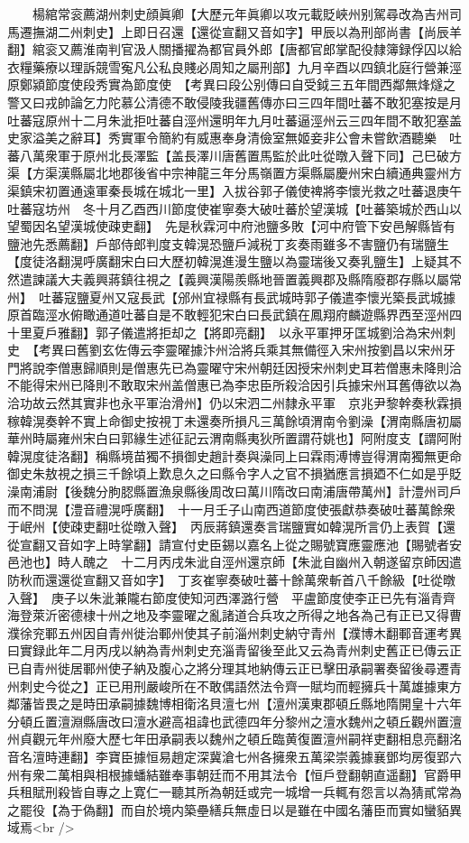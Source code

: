　　楊綰常衮薦湖州刺史顔眞卿【大歷元年眞卿以攻元載貶峽州别駕尋改為吉州司馬遷撫湖二州刺史】上即日召還【還從宣翻又音如字】甲辰以為刑部尚書【尚辰羊翻】綰衮又薦淮南判官汲人關播擢為都官員外郎【唐都官郎掌配役隸簿録俘囚以給衣糧藥療以理訴競雪寃凡公私良賤必周知之屬刑部】九月辛酉以四鎮北庭行營兼涇原鄭潁節度使段秀實為節度使　【考異曰段公别傳曰自受鉞三五年間西鄰無烽燧之警又曰戎帥論乞力陀慕公清德不敢侵陵我疆舊傳亦曰三四年間吐蕃不敢犯塞按是月吐蕃寇原州十二月朱泚拒吐蕃自涇州還明年九月吐蕃逼涇州云三四年間不敢犯塞盖史家溢美之辭耳】秀實軍令簡約有威惠奉身清儉室無姬妾非公會未嘗飲酒聽樂　吐蕃八萬衆軍于原州北長澤監【盖長澤川唐舊置馬監於此吐從暾入聲下同】己巳破方渠【方渠漢縣屬北地郡後省中宗神龍三年分馬嶺置方渠縣屬慶州宋白續通典靈州方渠鎮宋初置通遠軍秦長城在城北一里】入拔谷郭子儀使禆將李懷光救之吐蕃退庚午吐蕃寇坊州　冬十月乙酉西川節度使崔寧奏大破吐蕃於望漢城【吐蕃築城於西山以望蜀因名望漢城使疎吏翻】　先是秋霖河中府池鹽多敗【河中府管下安邑解縣皆有鹽池先悉薦翻】戶部侍郎判度支韓滉恐鹽戶減税丁亥奏雨雖多不害鹽仍有瑞鹽生【度徒洛翻滉呼廣翻宋白曰大歷初韓滉進漫生鹽以為靈瑞後又奏乳鹽生】上疑其不然遣諫議大夫義興蔣鎮往視之【義興漢陽羨縣地晉置義興郡及縣隋廢郡存縣以屬常州】　吐蕃寇鹽夏州又寇長武【邠州宜禄縣有長武城時郭子儀遣李懷光築長武城據原首臨涇水俯瞰通道吐蕃自是不敢輕犯宋白曰長武鎮在鳳翔府麟遊縣界西至涇州四十里夏戶雅翻】郭子儀遣將拒却之【將即亮翻】　以永平軍押牙匡城劉洽為宋州刺史　【考異曰舊劉玄佐傳云李靈曜據汴州洽將兵乘其無備徑入宋州按劉昌以宋州牙門將說李僧惠歸順則是僧惠先已為靈曜守宋州朝廷因授宋州刺史耳若僧惠未降則洽不能得宋州已降則不敢取宋州盖僧惠已為李忠臣所殺洽因引兵據宋州耳舊傳欲以為洽功故云然其實非也永平軍治滑州】仍以宋泗二州隸永平軍　京兆尹黎幹奏秋霖損稼韓滉奏幹不實上命御史按視丁未還奏所損凡三萬餘頃渭南令劉澡【渭南縣唐初屬華州時屬雍州宋白曰郭緣生述征記云渭南縣夷狄所置謂苻姚也】阿附度支【謂阿附韓滉度徒洛翻】稱縣境苗獨不損御史趙計奏與澡同上曰霖雨溥博豈得渭南獨無更命御史朱敖視之損三千餘頃上歎息久之曰縣令字人之官不損猶應言損廼不仁如是乎貶澡南浦尉【後魏分朐䏰縣置漁泉縣後周改曰萬川隋改曰南浦唐帶萬州】計澧州司戶而不問滉【澧音禮滉呼廣翻】　十一月壬子山南西道節度使張獻恭奏破吐蕃萬餘衆于岷州【使疎吏翻吐從暾入聲】　丙辰蔣鎮還奏言瑞鹽實如韓滉所言仍上表賀【還從宣翻又音如字上時掌翻】請宣付史臣錫以嘉名上從之賜號寶應靈應池【賜號者安邑池也】時人醜之　十二月丙戌朱泚自涇州還京師【朱泚自幽州入朝遂留京師因遣防秋而還還從宣翻又音如字】　丁亥崔寧奏破吐蕃十餘萬衆斬首八千餘級【吐從暾入聲】　庚子以朱泚兼隴右節度使知河西澤潞行營　平盧節度使李正已先有淄青齊海登萊沂密德棣十州之地及李靈曜之亂諸道合兵攻之所得之地各為己有正已又得曹濮徐兖鄆五州因自青州徙治鄆州使其子前淄州刺史納守青州【濮博木翻鄆音運考異曰實録此年二月丙戌以納為青州刺史充淄青留後至此又云為青州刺史舊正已傳云正已自青州徙居鄆州使子納及腹心之將分理其地納傳云正已擊田承嗣署奏留後尋遷青州刺史今從之】正已用刑嚴峻所在不敢偶語然法令齊一賦均而輕擁兵十萬雄據東方鄰藩皆畏之是時田承嗣據魏博相衛洺貝澶七州【澶州漢東郡頓丘縣地隋開皇十六年分頓丘置澶淵縣唐改曰澶水避高祖諱也武德四年分黎州之澶水魏州之頓丘觀州置澶州貞觀元年州廢大歷七年田承嗣表以魏州之頓丘臨黄復置澶州嗣祥吏翻相息亮翻洺音名澶時連翻】李寶臣據恒易趙定深冀滄七州各擁衆五萬梁崇義據襄鄧均房復郢六州有衆二萬相與相根據蟠結雖奉事朝廷而不用其法令【恒戶登翻朝直遥翻】官爵甲兵租賦刑殺皆自專之上寛仁一聽其所為朝廷或完一城增一兵輒有怨言以為猜貳常為之罷役【為于偽翻】而自於境内築壘繕兵無虛日以是雖在中國名藩臣而實如蠻貊異域焉<br />
